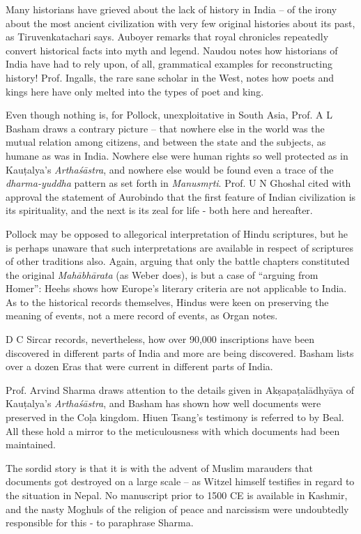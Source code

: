 Many historians have grieved about the lack of history in India – of the irony about the most ancient civilization with very few original histories about its past, as Tiruvenkatachari says. Auboyer remarks that royal chronicles repeatedly convert historical facts into myth and legend. Naudou notes how historians of India have had to rely upon, of all, grammatical examples for reconstructing history! Prof. Ingalls, the rare sane scholar in the West, notes how poets and kings here have only melted into the types of poet and king.

Even though nothing is, for Pollock, unexploitative in South Asia, Prof. A L Basham draws a contrary picture – that nowhere else in the world was the mutual relation among citizens, and between the state and the subjects, as humane as was in India. Nowhere else were human rights so well protected as in Kauṭalya’s \textit{Arthaśāstra}, and nowhere else would be found even a trace of the \textit{dharma-yuddha} pattern as set forth in \textit{Manusmṛti}. Prof. U N Ghoshal cited with approval the statement of Aurobindo that the first feature of Indian civilization is its spirituality, and the next is its zeal for life - both here and hereafter.

Pollock may be opposed to allegorical interpretation of Hindu scriptures, but he is perhaps unaware that such interpretations are available in respect of scriptures of other traditions also. Again, arguing that only the battle chapters constituted the original \textit{Mahābhārata} (as Weber does), is but a case of “arguing from Homer”: Heehs shows how Europe’s literary criteria are not applicable to India. As to the historical records themselves, Hindus were keen on preserving the meaning of events, not a mere record of events, as Organ notes.

D C Sircar records, nevertheless, how over 90,000 inscriptions have been discovered in different parts of India and more are being discovered. Basham lists over a dozen Eras that were current in different parts of India.

Prof. Arvind Sharma draws attention to the details given in Akṣapaṭalādhyāya of Kauṭalya’s \textit{Arthaśāstra}, and Basham has shown how well documents were preserved in the Coḷa kingdom. Hiuen Tsang’s testimony is referred to by Beal. All these hold a mirror to the meticulousness with which documents had been maintained. 

The sordid story is that it is with the advent of Muslim marauders that documents got destroyed on a large scale – as Witzel himself testifies in regard to the situation in Nepal. No manuscript prior to 1500 CE is available in Kashmir, and the nasty Moghuls of the religion of peace and narcissism were undoubtedly responsible for this - to paraphrase Sharma.


